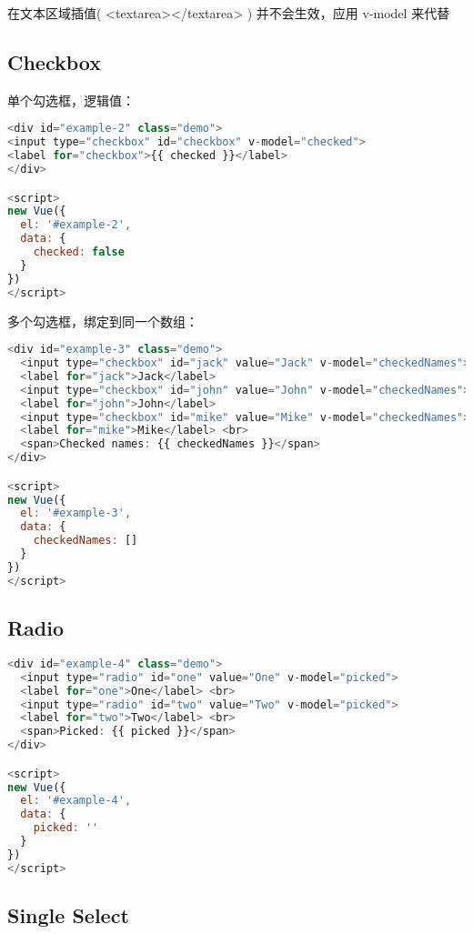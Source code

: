 在文本区域插值( <textarea></textarea> ) 并不会生效，应用 v-model 来代替

\subsection{Checkbox}

单个勾选框，逻辑值：


\begin{lstlisting}[language=JavaScript]
<div id="example-2" class="demo">
<input type="checkbox" id="checkbox" v-model="checked"> 
<label for="checkbox">{{ checked }}</label>
</div>

<script>
new Vue({
  el: '#example-2',
  data: {
    checked: false
  }
})
</script>
\end{lstlisting}

多个勾选框，绑定到同一个数组：





\begin{lstlisting}[language=JavaScript]
<div id="example-3" class="demo">
  <input type="checkbox" id="jack" value="Jack" v-model="checkedNames"> 
  <label for="jack">Jack</label> 
  <input type="checkbox" id="john" value="John" v-model="checkedNames"> 
  <label for="john">John</label> 
  <input type="checkbox" id="mike" value="Mike" v-model="checkedNames"> 
  <label for="mike">Mike</label> <br> 
  <span>Checked names: {{ checkedNames }}</span>
</div>

<script>
new Vue({
  el: '#example-3',
  data: {
    checkedNames: []
  }
})
</script>
\end{lstlisting}

\subsection{Radio}


\begin{lstlisting}[language=JavaScript]
<div id="example-4" class="demo">
  <input type="radio" id="one" value="One" v-model="picked"> 
  <label for="one">One</label> <br> 
  <input type="radio" id="two" value="Two" v-model="picked"> 
  <label for="two">Two</label> <br> 
  <span>Picked: {{ picked }}</span>
</div>

<script>
new Vue({
  el: '#example-4',
  data: {
    picked: ''
  }
})
</script>
\end{lstlisting}



\subsection{Single Select}



